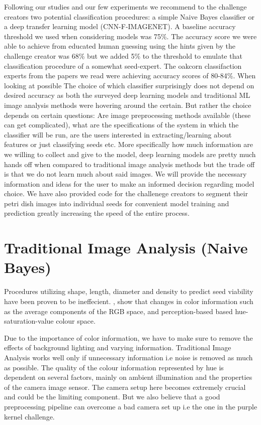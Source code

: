 \documentclass[letterpaper, 10 pt, conference]{ieeeconf}  %
\begin{document}
Following our studies and our few experiments we recommend to the challenge creators two potential classification procedures: a simple Naive Bayes classifier or a deep transfer learning model (CNN-F-IMAGENET). A baseline accuracy threshold we used when considering models was 75\%. The accuracy score we were able to achieve from educated human guessing using the hints given by the challenge creator was 68\% but we added 5\% to the threshold to emulate that classification procedure of a somewhat seed-expert. The oakcorn classifaction experts from the papers we read were achieving accuracy scores of 80-84\%. When looking at possible The choice of which classifier surprisingly does not depend on desired accuracy as both the surveyed deep learning models and traditional ML image analysis methods were hovering around the certain. But rather the choice depends on certain questions: Are image preprocessing methods available (these can get complicated), what are the specifications of the system in which the classifier will be run, are the users interested in extracting/learning about features or just classifying seeds etc. More specifically how much information are we willing to collect and give to the model, deep learning models are pretty much hands off when compared to traditional image analysis methods but the trade off is that we do not learn much about said images. We will provide the necessary information and ideas for the user to make an informed decision regarding model choice. We have also provided code for the challenege creators to segment their petri dish images into individual seeds for convenient model training and prediction greatly increasing the speed of the entire process. 

\section{Traditional Image Analysis (Naive Bayes)}

Procedures utilizing shape, length, diameter and
density to predict seed viability have been proven to be ineffecient. \cite{Jablonski2016ColourBasedBD},\cite{DBLP:journals/cea/PrzybyloJ19} show that changes in color information such as the average components of the RGB space, and perception-based based hue-saturation-value
colour space.

Due to the importance of color information, we have to make sure to remove the effects of background lighting and varying information. Traditional Image Analysis works well only if unnecessary information i.e noise is removed as much as possible. The quality of the colour information represented by hue is dependent on several factors, mainly on ambient illumination and the properties of the camera image sensor. The camera setup here becomes extremely crucial and could be the limiting component. But we also believe that a good preprocessing pipeline can overcome a bad camera set up i.e the one in the purple kernel challenge. 
\end{document}
